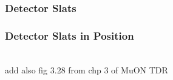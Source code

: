 \documentclass{beamer}
\begin{document}
\begin{frame}
\frametitle{Detector Slats}

\end{frame}

\begin{frame}
\frametitle{Detector Slats in Position}
 \\
add also fig 3.28 from chp 3 of MuON TDR
\end{frame}
\end{document}
